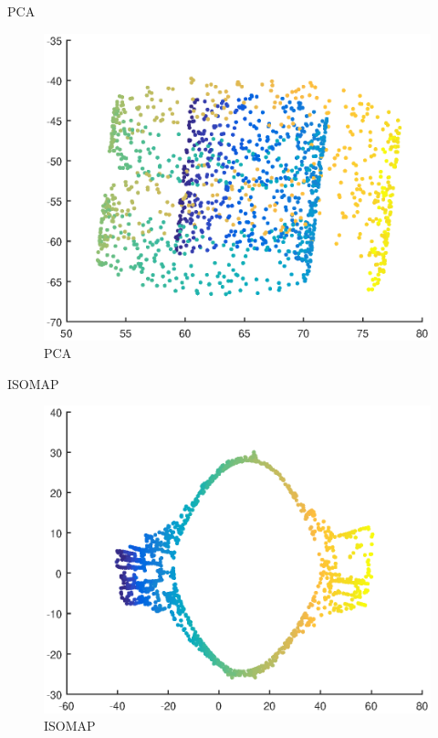 \documentclass{beamer}
\begin{document}
\begin{darkframes}
   
   \begin{frame}{PCA}
   \begin{figure}
   \centering
   \includegraphics[scale=0.5]{./figs/pca.eps}
   \caption{PCA}
   \end{figure}
   \end{frame}
   
   \begin{frame}{ISOMAP}
   \begin{figure}
   \centering
   \includegraphics[scale=0.5]{./figs/isomap.eps}
   \caption{ISOMAP}
   \end{figure}
   \end{frame}   
   

\end{darkframes}
\end{document}
